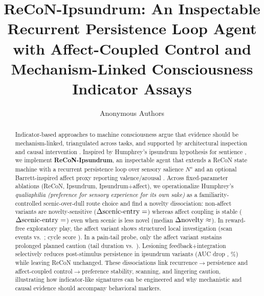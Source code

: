 \documentclass[letterpaper]{article} %
\title{ReCoN-Ipsundrum: An Inspectable Recurrent Persistence Loop Agent with Affect-Coupled Control and Mechanism-Linked Consciousness Indicator Assays}
\author{Anonymous Authors}
\providecommand{\ModelRecon}{ReCoN }
\begin{document}
\maketitle
\sloppy

\begin{abstract}
Indicator-based approaches to machine consciousness argue that evidence should be mechanism-linked, triangulated across tasks, and supported by architectural inspection and causal intervention \citep{ButlinEtAl2025Indicators}. Inspired by Humphrey's ipsundrum hypothesis for sentience \citep{Humphrey2023Sentience}, we implement \textbf{ReCoN-Ipsundrum}, an inspectable agent that extends a ReCoN state machine \citep{BachHerger2015ReCoN} with a recurrent persistence loop over sensory salience $N^s$ and an optional Barrett-inspired affect proxy reporting valence/arousal \citep{Barrett2017HowEmotions}. Across fixed-parameter ablations (ReCoN, Ipsundrum, Ipsundrum+affect), we operationalize Humphrey's \emph{qualiaphilia (preference for sensory experience for its own sake)} as a familiarity-controlled scenic-over-dull route choice and find a novelty dissociation: non-affect variants are novelty-sensitive ($\Delta\text{scenic-entry}=\Claim{fam_delta_scenic_entry_recon}$) whereas affect coupling is stable ($\Delta\text{scenic-entry}=\Claim{fam_delta_scenic_entry_hb}$) even when scenic is less novel (median $\Delta\text{novelty}\approx \Claim{fam_median_delta_novelty_hb_scenic}$). In reward-free exploratory play, the affect variant shows structured local investigation (scan events  vs.\ ; cycle score ). In a pain-tail probe, only the affect variant sustains prolonged planned caution (tail duration  vs.\ ). Lesioning feedback+integration selectively reduces post-stimulus persistence in ipsundrum variants (AUC drop , \%) while leaving \ModelRecon unchanged. These dissociations link recurrence$\rightarrow$persistence and affect-coupled control$\rightarrow$preference stability, scanning, and lingering caution, illustrating how indicator-like signatures can be engineered and why mechanistic and causal evidence should accompany behavioral markers.
\end{abstract}
\begin{links}
\end{links}
\end{document}
